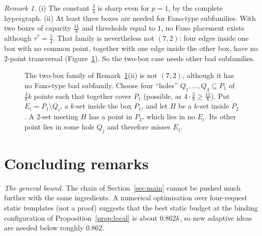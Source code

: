 \documentclass[11pt]{amsart}
\theoremstyle{definition}
\theoremstyle{remark}
\newtheorem{remark}[theorem]{Remark}
\begin{document}
\begin{remark}\label{rem:threshold}
(i) The constant $\frac34$ is sharp even for $p=1$, by the complete hypergraph.
(ii) At least three boxes are needed for Fano-type subfamilies. With two boxes of capacity $\frac{11}8$ and thresholds equal to $1$, no Fano placement exists although $\tau^*=\frac34$. That family is nevertheless not $(7,2)$: four edges inside one box with no common point, together with one edge inside the other box, have no $2$-point transversal (Figure~\ref{fig:twobox}). So the two-box case needs other bad subfamilies.
\end{remark}

\begin{figure}[htb]
\centering
{}
\caption{The two-box family of Remark~\ref{rem:threshold}(ii) is not $(7,2)$, although it has no Fano-type bad subfamily. Choose four ``holes'' $Q_1,\dots,Q_4\subseteq P_1$ of $\frac38k$ points each that together cover $P_1$ (possible, as $4\cdot\frac38\ge\frac{11}8$). Put $E_i=P_1\setminus Q_i$, a $k$-set inside the box $P_1$, and let $H$ be a $k$-set inside $P_2$. A $2$-set meeting $H$ has a point in $P_2$, which lies in no $E_i$. Its other point lies in some hole $Q_j$ and therefore misses $E_j$.}\label{fig:twobox}
\end{figure}


\section{Concluding remarks}

\emph{The general bound.} The chain of Section~\ref{sec:main} cannot be pushed much further with the same ingredients. A numerical optimisation over four-request static templates (not a proof) suggests that the best static budget at the binding configuration of Proposition~\ref{prop:local} is about $0.862k$, so new adaptive ideas are needed below roughly $0.862$.
\end{document}
